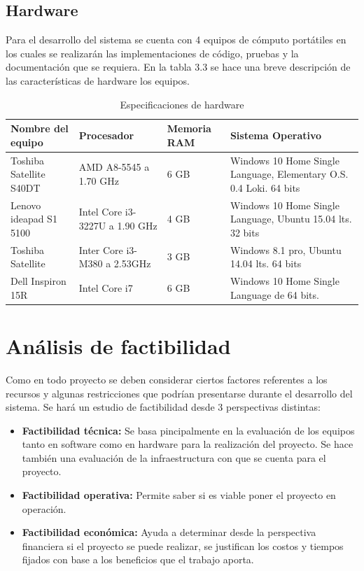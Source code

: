 \documentclass[12pt]{report}
\begin{document}
\subsection{Hardware}
Para el desarrollo del sistema se cuenta con 4 equipos de cómputo portátiles en los cuales se realizarán las implementaciones de código, pruebas y la documentación que se requiera. En la tabla 3.3 se hace una breve descripción de las características de hardware los equipos.

\begin{table}[H]
\begin{center}
\begin{tabular}{|p{30mm}|p{30mm}|p{20mm}|p{40mm}|}
\hline
 Nombre del equipo & Procesador & Memoria RAM & Sistema Operativo\\
\hline \hline 
Toshiba Satellite S40DT & AMD A8-5545 a 1.70 GHz  & 6 GB & Windows 10 Home Single Language, Elementary O.S. 0.4 Loki. 64 bits\\
\hline
Lenovo ideapad S1 5100 & Intel Core i3-3227U a 1.90 GHz & 4 GB & Windows 10 Home Single Language, Ubuntu 15.04 lts. 32 bits\\
\hline
Toshiba Satellite  & Inter Core i3-M380 a 2.53GHz  & 3 GB & Windows 8.1 pro, Ubuntu 14.04 lts. 64 bits\\
\hline
Dell Inspiron 15R & Intel Core i7 & 6 GB & Windows 10 Home Single Language de 64 bits. \\
\hline
\end{tabular}
\caption{Especificaciones de hardware}
\end{center}
\end{table}

\section{Análisis de factibilidad}
Como en todo proyecto se deben considerar ciertos factores referentes a los recursos y algunas restricciones que podrían presentarse durante el desarrollo del sistema. Se hará un estudio de factibilidad
desde 3 perspectivas distintas:
\begin{itemize}
\item \textbf{Factibilidad técnica: }Se basa pincipalmente en la evaluación de los equipos tanto en software como en hardware para la realización del proyecto. Se hace también una evaluación de la infraestructura
con que se cuenta para el proyecto.
\item \textbf{Factibilidad operativa: }Permite saber si es viable poner el proyecto en operación.
\item \textbf{Factibilidad económica: }Ayuda a determinar desde la perspectiva financiera si el proyecto se puede realizar, se justifican los costos y tiempos fijados con base a los beneficios que el trabajo aporta.
\end{itemize}
\end{document}
